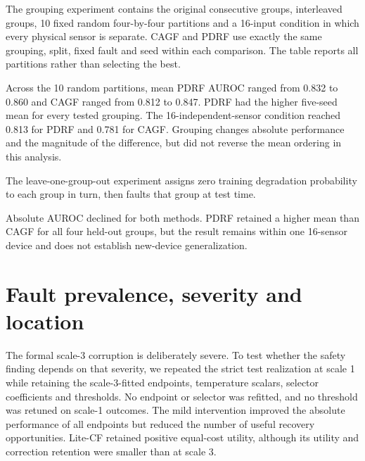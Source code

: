 \documentclass[10pt]{article}
\begin{document}
The grouping experiment contains the original consecutive groups, interleaved groups, 10 fixed random four-by-four partitions and a 16-input condition in which every physical sensor is separate. CAGF and PDRF use exactly the same grouping, split, fixed fault and seed within each comparison. The table reports all partitions rather than selecting the best.

\begin{table}[p]
\centering
\caption{Complete grouping distribution. PDRF wins count paired seed differences within a grouping.}
\resizebox{0.90\textwidth}{!}{}
\end{table}

Across the 10 random partitions, mean PDRF AUROC ranged from 0.832 to 0.860 and CAGF ranged from 0.812 to 0.847. PDRF had the higher five-seed mean for every tested grouping. The 16-independent-sensor condition reached 0.813 for PDRF and 0.781 for CAGF. Grouping changes absolute performance and the magnitude of the difference, but did not reverse the mean ordering in this analysis.

The leave-one-group-out experiment assigns zero training degradation probability to each group in turn, then faults that group at test time.

\begin{table}[ht]
\centering
\caption{Leave-one-group-out degradation training. Values are means across five seeds.}
\resizebox{0.65\textwidth}{!}{}
\end{table}

Absolute AUROC declined for both methods. PDRF retained a higher mean than CAGF for all four held-out groups, but the result remains within one 16-sensor device and does not establish new-device generalization.

\section{Fault prevalence, severity and location}

The formal scale-3 corruption is deliberately severe. To test whether the safety finding depends on that severity, we repeated the strict test realization at scale 1 while retaining the scale-3-fitted endpoints, temperature scalars, selector coefficients and thresholds. No endpoint or selector was refitted, and no threshold was retuned on scale-1 outcomes. The mild intervention improved the absolute performance of all endpoints but reduced the number of useful recovery opportunities. Lite-CF retained positive equal-cost utility, although its utility and correction retention were smaller than at scale 3.
\end{document}
